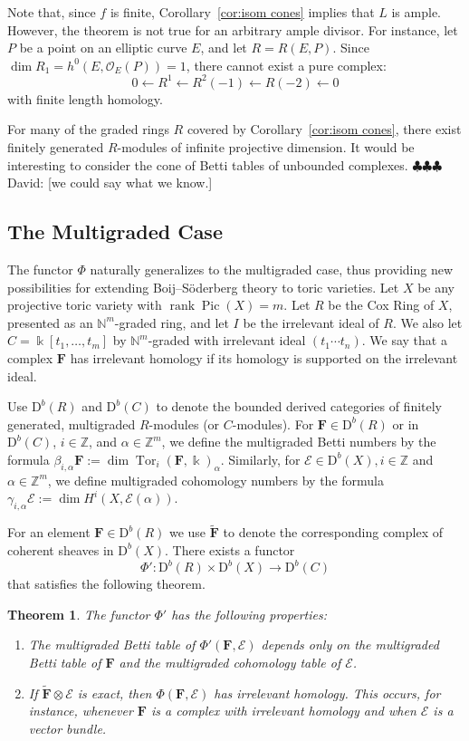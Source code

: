\documentclass[12pt]{amsart}
\newtheorem{theorem}[lemma]{Theorem}
\theoremstyle{definition}
\theoremstyle{remark}
\newcommand{\Pic}{\operatorname{Pic}}
\newcommand{\Tor}{\operatorname{Tor}}
\newcommand{\kk}{\Bbbk}
\newcommand{\rank}{\operatorname{rank}}
\newcommand{\ZZ}{\mathbb{Z}}
\newcommand{\cO}{\mathcal{O}}
\newcommand{\cE}{\mathcal{E}}
\newcommand{\FF}{\mathbf{F}}
\newcommand{\defi}[1]{\textsf{#1}} %
\newcommand{\DD}{\mathrm{D}}
\newcommand{\david}[1]{{\color{red} \sf $\clubsuit\clubsuit\clubsuit$ David: [#1]}}
\begin{document}
Note that, since $f$ is finite, Corollary~\ref{cor:isom cones} implies that $L$ is ample.  However, the theorem is not true for an arbitrary ample divisor.  For instance, let $P$ be a point on an elliptic curve $E$, and let $R=R(E,P)$.  Since $\dim R_1=h^0(E,\cO_E(P))=1$, there cannot exist a pure complex:
\[
0\gets R^1\gets R^2(-1)\gets R(-2)\gets 0
\]
with finite length homology.

For many of the graded rings $R$ covered by Corollary~\ref{cor:isom cones}, there exist finitely generated $R$-modules of infinite projective dimension.  It would  be interesting to consider the cone of Betti tables of unbounded complexes. \david{we could say what we know.}

\subsection*{The Multigraded Case}
The functor $\Phi$ naturally generalizes to the multigraded case, thus providing new possibilities for extending Boij--S\"oderberg theory to toric varieties.  Let $X$ be any projective toric variety with $\rank \Pic(X)=m$.  Let $R$ be the Cox Ring of $X$, presented as an $\mathbb N^m$-graded ring, and let $I$ be the irrelevant ideal of $R$.  We also let $C=\kk[t_1, \dots, t_m]$ by $\mathbb N^m$-graded with irrelevant ideal $(t_1\cdots t_n)$.  We say that a complex $\FF$ has \defi{irrelevant homology} if its homology is supported on the irrelevant ideal.

Use $\DD^b(R)$ and $\DD^b(C)$ to denote the bounded derived categories of finitely generated, multigraded $R$-modules (or $C$-modules).   For $\FF\in \DD^b(R)$ or in $\DD^b(C)$, $i\in \ZZ$, and $\alpha\in \ZZ^m$, we define the multigraded Betti numbers by the formula $\beta_{i,\alpha} \FF:=\dim \Tor_i(\FF,\kk)_{\alpha}$.  Similarly, for $\cE\in \DD^b(X), i\in \ZZ$ and $\alpha\in \ZZ^m$, we define multigraded cohomology numbers by the formula $\gamma_{i,\alpha} \cE:=\dim H^i(X, \cE(\alpha))$.  


For an element $\FF\in \DD^b(R)$ we use $\widetilde{\FF}$ to denote the corresponding complex of coherent sheaves in $\DD^b(X)$.  There exists a functor
\[
\Phi': \DD^b(R)\times \DD^b(X)\to \DD^b(C)
\]
that satisfies the following theorem.
\begin{theorem}\label{thm:Phimulti}
The functor $\Phi'$ has the following  properties:
\begin{enumerate}
	\item\label{thm:Phi':1}  The multigraded Betti table of $\Phi'(\FF,\cE)$ depends only on the multigraded Betti table of $\FF$ and the multigraded cohomology table of $\cE$.
	\item\label{thm:Phi':2}  If $\widetilde{\FF}\otimes \cE$ is exact, then $\Phi(\FF,\cE)$ has irrelevant homology.  This occurs, for instance, whenever $\FF$ is a complex with irrelevant homology and when $\cE$ is a vector bundle.
\end{enumerate}
\end{theorem}
\end{document}
